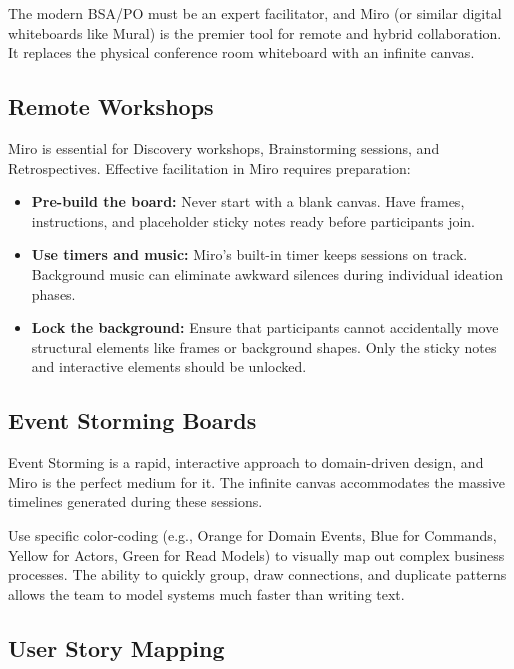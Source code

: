 The modern BSA/PO must be an expert facilitator, and Miro (or similar
digital whiteboards like Mural) is the premier tool for remote and
hybrid collaboration. It replaces the physical conference room
whiteboard with an infinite canvas.

\subsection{Remote Workshops}\label{remote-workshops}

Miro is essential for Discovery workshops, Brainstorming sessions, and
Retrospectives. Effective facilitation in Miro requires preparation:

\begin{itemize}
\tightlist
\item
  \textbf{Pre-build the board:} Never start with a blank canvas. Have
  frames, instructions, and placeholder sticky notes ready before
  participants join.
\item
  \textbf{Use timers and music:} Miro's built-in timer keeps sessions on
  track. Background music can eliminate awkward silences during
  individual ideation phases.
\item
  \textbf{Lock the background:} Ensure that participants cannot
  accidentally move structural elements like frames or background
  shapes. Only the sticky notes and interactive elements should be
  unlocked.
\end{itemize}

\subsection{Event Storming Boards}\label{event-storming-boards}

Event Storming is a rapid, interactive approach to domain-driven design,
and Miro is the perfect medium for it. The infinite canvas accommodates
the massive timelines generated during these sessions.

Use specific color-coding (e.g., Orange for Domain Events, Blue for
Commands, Yellow for Actors, Green for Read Models) to visually map out
complex business processes. The ability to quickly group, draw
connections, and duplicate patterns allows the team to model systems
much faster than writing text.

\subsection{User Story Mapping}\label{user-story-mapping}

